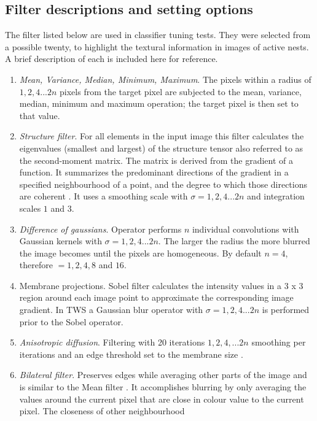 \subsection{Filter descriptions and setting options}\label{sec:filter-descriptions}
The filter listed below are used in classifier tuning tests. They were selected from a possible twenty, to highlight the textural information in images of active nests. A brief description of each is included here for reference.

\begin{enumerate}
\item \emph{Mean, Variance, Median, Minimum, Maximum}. The pixels within a radius of $ 1, 2, 4 ... 2n $ pixels from the target pixel are subjected to the mean, variance, median, minimum and maximum operation; the target pixel is then set to that value. 
\item \emph{Structure filter}. For all elements in the input image this filter calculates the eigenvalues (smallest and largest) of the structure tensor also referred to as the second-moment matrix. The matrix is derived from the gradient of a function. It summarizes the predominant directions of the gradient in a specified neighbourhood of a point, and the degree to which those directions are coherent \cite{Meijering2007}. It uses a smoothing scale with $\sigma = 1, 2, 4...2n$ and integration scales $1$ and $3$.
\item \emph{Difference of gaussians}. Operator performs $ n $ individual convolutions with Gaussian kernels with $\sigma = 1, 2, 4... 2n$. The larger the radius the more blurred the image becomes until the pixels are homogeneous. By default $ n = 4 $, therefore $ = 1, 2, 4, 8$ and $16$. 
\item {Membrane projections}. Sobel filter calculates the intensity values in a 3 x 3 region around each image point to approximate the corresponding image gradient. In \ac{TWS} a Gaussian blur operator with $\sigma = 1, 2, 4... 2n $ is performed prior to the Sobel operator.
\item \emph{{Anisotropic diffusion}}. Filtering with 20 iterations $1, 2, 4, ... 2n$ smoothing per iterations and an edge threshold set to the membrane size \cite{Tschumperle2005}.
\item \emph{Bilateral filter}. Preserves edges while averaging other parts of the image and is similar to the Mean filter \cite{Chaudhury2011}. It accomplishes
blurring by only averaging the values around the current pixel that are close
in colour value to the current pixel. The closeness of other neighbourhood

\end{enumerate}
